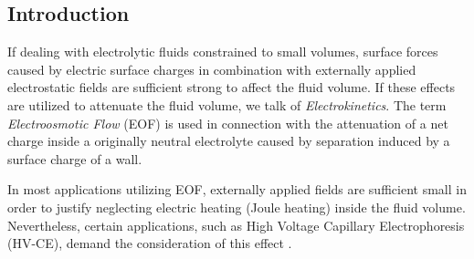 \noindent
{}
\begin{versiona}

\section{Introduction}

If dealing with electrolytic fluids constrained to small volumes, surface forces caused by electric surface charges in combination with externally applied electrostatic fields are sufficient strong to affect the fluid volume. If these effects are utilized to attenuate the fluid volume, we talk of \textit{Electrokinetics}. The term \textit{Electroosmotic Flow} (EOF) is used in connection with the attenuation of a net charge inside a originally neutral electrolyte caused by separation induced by a surface charge of a wall.

In most applications utilizing EOF, externally applied fields are sufficient small in order to justify neglecting electric heating (Joule heating) inside the fluid volume. Nevertheless, certain applications, such as High Voltage Capillary Electrophoresis (HV-CE), demand the consideration of this effect \cite{KnoMcC1994}.


\end{versiona}
